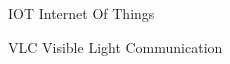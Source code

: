 \begin{siglas}

  \item[IOT]  Internet Of Things
  \item[VLC]  Visible Light Communication  

\end{siglas}
